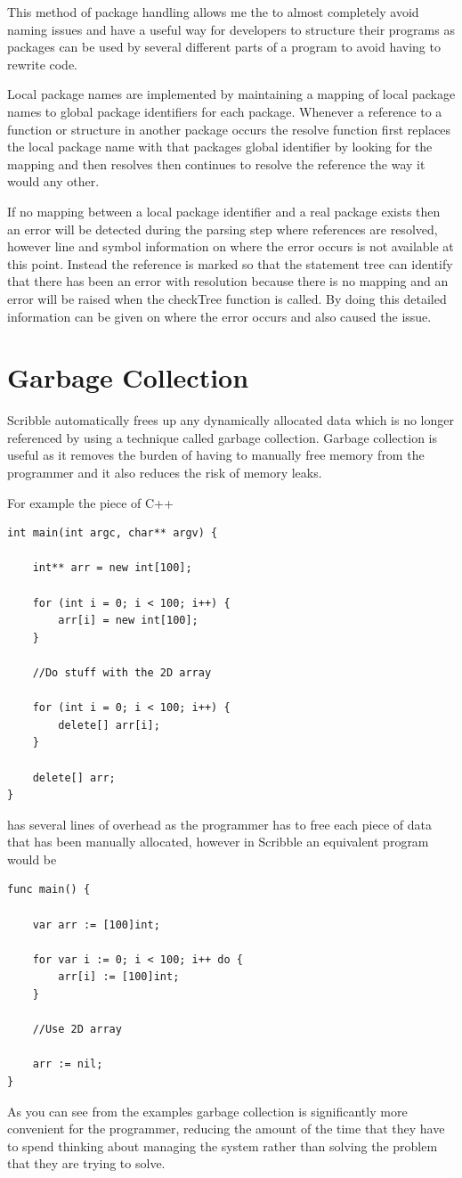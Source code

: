 \documentclass[]{final_report}
\begin{document}
This method of package handling allows me the to almost completely avoid naming issues and have a useful way for developers to structure their programs as packages can be used by several different parts of a program to avoid having to rewrite code.

Local package names are implemented by maintaining a mapping of local package names to global package identifiers for each package. Whenever a reference to a function or structure in another package occurs the resolve function first replaces the local package name with that packages global identifier by looking for the mapping and then resolves then continues to resolve the reference the way it would any other. 

If no mapping between a local package identifier and a real package exists then an error will be detected during the parsing step where references are resolved, however line and symbol information on where the error occurs is not available at this point. Instead the reference is marked so that the statement tree can identify that there has been an error with resolution because there is no mapping and an error will be raised when the checkTree function is called. By doing this detailed information can be given on where the error occurs and also caused the issue.

\chapter{Garbage Collection}

Scribble automatically frees up any dynamically allocated data which is no longer referenced by using a technique called garbage collection. Garbage collection is useful as it removes the burden of having to manually free memory from the programmer and it also reduces the risk of memory leaks. 

For example the piece of C++
\begin{verbatim}
int main(int argc, char** argv) {

	int** arr = new int[100];
	
	for (int i = 0; i < 100; i++) {
		arr[i] = new int[100];		
	}
	
	//Do stuff with the 2D array
	
	for (int i = 0; i < 100; i++) {
		delete[] arr[i];
	}
	
	delete[] arr;
}
\end{verbatim}
has several lines of overhead as the programmer has to free each piece of data that has been manually allocated, however in Scribble an equivalent program would be
\begin{verbatim}
func main() {

	var arr := [100]int;
	
	for var i := 0; i < 100; i++ do {
		arr[i] := [100]int;
	}
	
	//Use 2D array
	
	arr := nil;
}
\end{verbatim}
As you can see from the examples garbage collection is significantly more convenient for the programmer, reducing the amount of the time that they have to spend thinking about managing the system rather than solving the problem that they are trying to solve.
\end{document}
